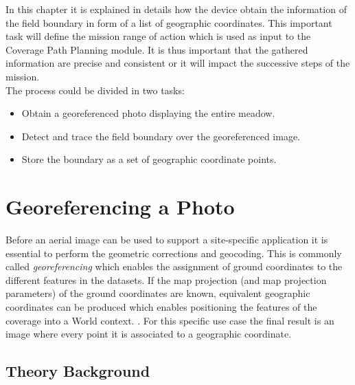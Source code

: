 In this chapter it is explained in details how the device obtain the information of the field boundary in form of a list of geographic coordinates.
This important task will define the mission range of action which is used as input to the Coverage Path Planning module. It is thus important that the gathered information are precise and consistent or it will impact the successive steps of the mission.\\
The process could be divided in two tasks:
\begin{itemize}
	\item Obtain a georeferenced photo displaying the entire meadow.
	\item Detect and trace the field boundary over the georeferenced image.
	\item Store the boundary as a set of geographic coordinate points.
\end{itemize}

\section{Georeferencing a Photo} %
\label{sec:georeferenced_photo}
Before an aerial image can be used to support a site-specific application it is essential to perform the geometric corrections and geocoding. This is commonly called \textit{georeferencing} which enables the assignment of ground coordinates to the different features in the datasets. If the map projection (and map projection parameters) of the ground coordinates are known, equivalent geographic coordinates can be produced which enables positioning the features of the coverage into a World context. \cite{georefPractice}.
For this specific use case the final result is an image where every point it is associated to a geographic coordinate.

\subsection{Theory Background} %
\label{sub:theory_background}


